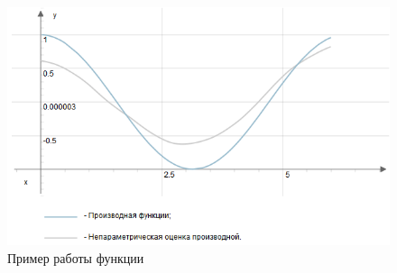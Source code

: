  \begin{figure} [h] 
   \center
   \includegraphics {MHL_NonparametricEstimatorOfDerivative6.png}
   \caption{Пример работы функции} 
   \label{img:MHL_NonparametricEstimatorOfDerivative6}  
 \end{figure}